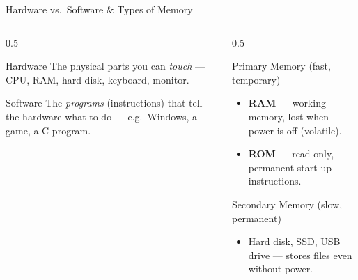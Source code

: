 \documentclass[aspectratio=169]{beamer}
\begin{document}
	\begin{frame}{Hardware vs.\ Software \& Types of Memory}
		\begin{columns}[T]
			\begin{column}{0.5\textwidth}
				\begin{block}{Hardware}
					The physical parts you can \emph{touch} --- CPU, RAM, hard disk, keyboard, monitor.
				\end{block}
				\begin{block}{Software}
					The \emph{programs} (instructions) that tell the hardware what to do --- e.g.\ Windows, a game, a C program.
				\end{block}
			\end{column}
			\begin{column}{0.5\textwidth}
				\begin{block}{Primary Memory (fast, temporary)}
					\begin{itemize}\small
						\item \textbf{RAM} --- working memory, lost when power is off (volatile).
						\item \textbf{ROM} --- read-only, permanent start-up instructions.
					\end{itemize}
				\end{block}
				\begin{block}{Secondary Memory (slow, permanent)}
					\begin{itemize}\small
						\item Hard disk, SSD, USB drive --- stores files even without power.
					\end{itemize}
				\end{block}
			\end{column}
		\end{columns}
	\end{frame}
	
\end{document}
